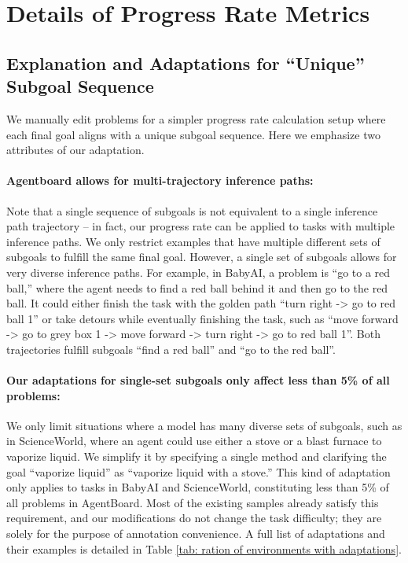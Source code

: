 \section{Details of Progress Rate Metrics\label{sec: Annotation of Subgoals}}

\subsection{Explanation and Adaptations for ``Unique'' Subgoal Sequence \label{sec: explanation for adaptation}}

We manually edit problems for a simpler progress rate calculation setup where each final goal aligns with a unique subgoal sequence. Here we emphasize two attributes of our adaptation. 

\paragraph{Agentboard allows for multi-trajectory inference paths:} Note that a single sequence of subgoals is not equivalent to a single inference path trajectory – in fact, our progress rate can be applied to tasks with multiple inference paths. We only restrict examples that have multiple different sets of subgoals to fulfill the same final goal. However, a single set of subgoals allows for very diverse inference paths. For example, in BabyAI, a problem is ``go to a red ball,'' where the agent needs to find a red ball behind it and then go to the red ball. It could either finish the task with the golden path ``turn right -> go to red ball 1'' or take detours while eventually finishing the task, such as ``move forward -> go to grey box 1 -> move forward -> turn right -> go to red ball 1''. Both trajectories fulfill subgoals ``find a red ball” and “go to the red ball”.

\paragraph{Our adaptations for single-set subgoals only affect less than 5\% of all problems:} We only limit situations where a model has many diverse sets of subgoals, such as in ScienceWorld, where an agent could use either a stove or a blast furnace to vaporize liquid. We simplify it by specifying a single method and clarifying the goal ``vaporize liquid'' as ``vaporize liquid with a stove.'' This kind of adaptation only applies to tasks in BabyAI and ScienceWorld, constituting less than 5\% of all problems in AgentBoard. Most of the existing samples already satisfy this requirement, and our modifications do not change the task difficulty; they are solely for the purpose of annotation convenience. A full list of adaptations and their examples is detailed in Table \ref{tab: ration of environments with adaptations}.

